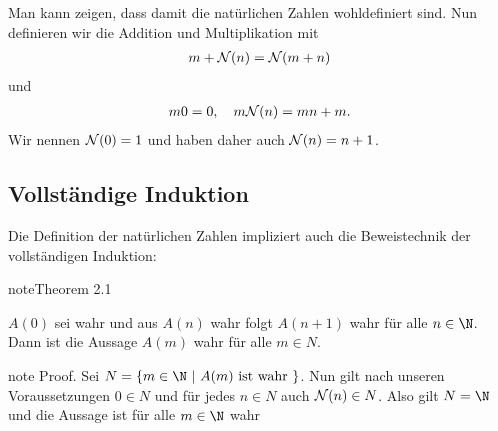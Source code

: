 \documentclass[letterpaper,10pt,english]{jupyterBook}
\begin{document}
Man kann zeigen, dass damit die natürlichen Zahlen wohldefiniert sind. Nun definieren wir die Addition und Multiplikation mit
\begin{equation*}
\begin{split} m + {\cal N}(n) = {\cal N}(m+n)\end{split}
\end{equation*}
und
\begin{equation*}
\begin{split} m 0 = 0, \quad m {\cal N}(n) = mn +m.\end{split}
\end{equation*}
Wir nennen \({\cal N}(0)=1\) und haben daher auch
\( {\cal N}(n) = n+1\).


\subsection{Vollständige Induktion}
\label{\detokenize{grundlagen/zahlensysteme:vollstandige-induktion}}
Die Definition der natürlichen Zahlen impliziert auch die Beweistechnik der vollständigen Induktion:
\label{grundlagen/zahlensysteme:theorem-1}
\begin{sphinxadmonition}{note}{Theorem 2.1}



\(A(0)\) sei wahr und aus \(A(n)\) wahr folgt \(A(n+1)\) wahr für alle \(n \in \N\). Dann ist die Aussage \(A(m)\) wahr für alle \(m \in N\).
\end{sphinxadmonition}

\begin{sphinxadmonition}{note}
Proof.  Sei \(N=\{m \in \N~|~A(m) \text{ ist wahr }\}\). Nun gilt nach unseren Voraussetzungen \(0 \in N\) und für jedes \(n \in N\) auch \({\cal N}(n) \in N\). Also gilt \(N= \N\) und die Aussage ist für alle \(m \in \N\) wahr
\end{sphinxadmonition}
\end{document}
